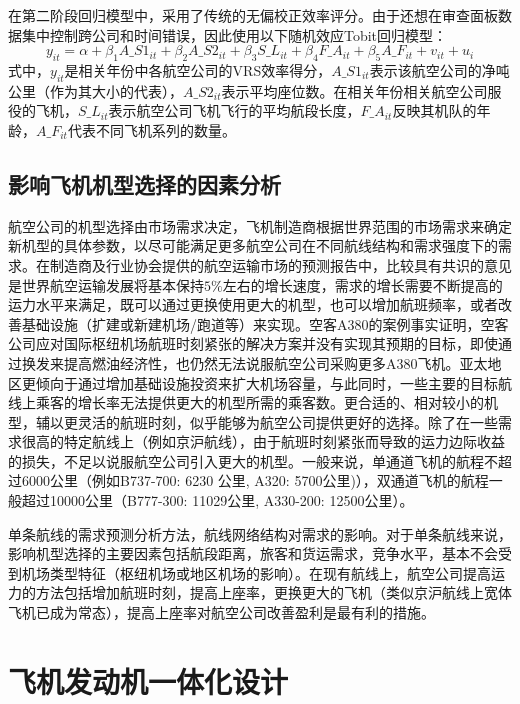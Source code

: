 \documentclass[12pt,a4paper]{report}
\begin{document}
在第二阶段回归模型中，采用了传统的无偏校正效率评分。由于还想在审查面板数据集中控制跨公司和时间错误，因此使用以下随机效应Tobit回归模型：
\begin{equation}
y_{it}=\alpha+\beta_1 A\_S1_{it}+\beta_2 A\_S2_{it}+\beta_3 S\_L_{it}+ \beta_4 F\_A_{it}+\beta_5 A\_F_{it}+v_{it}+u_i
\label{eq:prediction}
\end{equation}
式中，$y_{it}$是相关年份中各航空公司的VRS效率得分，$A\_S1_{it}$表示该航空公司的净吨公里（作为其大小的代表），$A\_S2_{it}$表示平均座位数。在相关年份相关航空公司服役的飞机，$S\_L_{it}$表示航空公司飞机飞行的平均航段长度，$F\_A_{it}$反映其机队的年龄，$A\_F_{it}$代表不同飞机系列的数量。


\subsection{影响飞机机型选择的因素分析}

航空公司的机型选择由市场需求决定，飞机制造商根据世界范围的市场需求来确定新机型的具体参数，以尽可能满足更多航空公司在不同航线结构和需求强度下的需求。在制造商及行业协会提供的航空运输市场的预测报告中，比较具有共识的意见是世界航空运输发展将基本保持$5\%$左右的增长速度，需求的增长需要不断提高的运力水平来满足，既可以通过更换使用更大的机型，也可以增加航班频率，或者改善基础设施（扩建或新建机场/跑道等）来实现。空客A380的案例事实证明，空客公司应对国际枢纽机场航班时刻紧张的解决方案并没有实现其预期的目标，即使通过换发来提高燃油经济性，也仍然无法说服航空公司采购更多A380飞机。亚太地区更倾向于通过增加基础设施投资来扩大机场容量，与此同时，一些主要的目标航线上乘客的增长率无法提供更大的机型所需的乘客数。更合适的、相对较小的机型，辅以更灵活的航班时刻，似乎能够为航空公司提供更好的选择。除了在一些需求很高的特定航线上（例如京沪航线），由于航班时刻紧张而导致的运力边际收益的损失，不足以说服航空公司引入更大的机型。一般来说，单通道飞机的航程不超过6000公里（例如B737-700: 6230 公里, A320: 5700公里)），双通道飞机的航程一般超过10000公里（B777-300: 11029公里, A330-200: 12500公里）。

单条航线的需求预测分析方法，航线网络结构对需求的影响。对于单条航线来说，影响机型选择的主要因素包括航段距离，旅客和货运需求，竞争水平，基本不会受到机场类型特征（枢纽机场或地区机场的影响）。在现有航线上，航空公司提高运力的方法包括增加航班时刻，提高上座率，更换更大的飞机（类似京沪航线上宽体飞机已成为常态），提高上座率对航空公司改善盈利是最有利的措施。


\section{飞机发动机一体化设计}
\end{document}
